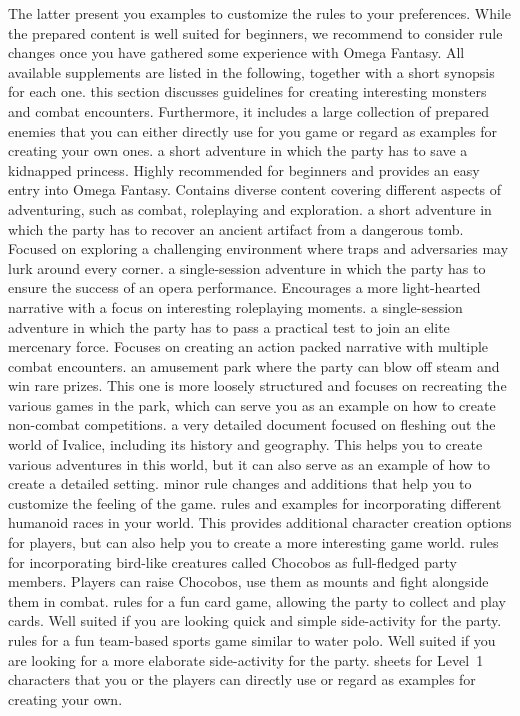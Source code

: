 The latter present you examples to customize the rules to your preferences.
While the prepared content is well suited for beginners, we recommend to consider rule changes once you have gathered some experience with Omega Fantasy.
All available supplements are listed in the following, together with a short synopsis for each one.
%
\newpage
%
 this section discusses guidelines for creating interesting monsters and combat encounters.
Furthermore, it includes a large collection of prepared enemies that you can either directly use for you game or regard as examples for creating your own ones.
%
\vfill
%
 a short adventure in which the party has to save a kidnapped princess. 
Highly recommended for beginners and provides an easy entry into Omega Fantasy.
Contains diverse content covering different aspects of adventuring, such as combat, roleplaying and exploration.
%
\vfill
%
 a short adventure in which the party has to recover an ancient artifact from a dangerous tomb.
Focused on exploring a challenging environment where traps and adversaries may lurk around every corner. 
%
\vfill
%
 a single-session adventure in which the party has to ensure the success of an opera performance.
Encourages a more light-hearted narrative with a focus on interesting roleplaying moments.
%
\vfill
%
 a single-session adventure in which the party has to pass a practical test to join an elite mercenary force.
Focuses on creating an action packed narrative with multiple combat encounters.
%
\vfill
%
 an amusement park where the party can blow off steam and win rare prizes. 
This one is more loosely structured and focuses on recreating the various games in the park, which can serve you as an example on how to create non-combat competitions.  
%
\vfill
%
 a very detailed document focused on fleshing out the world of Ivalice, including its history and geography.
This helps you to create various adventures in this world, but it can also serve as an example of how to create a detailed setting.
%
\vfill
%
 minor rule changes and additions that help you to customize the feeling of the game.
%
\vfill
%
 rules and examples for incorporating different humanoid races in your world. 
This provides additional character creation options for players, but can also help you to create a more interesting game world.
%
\vfill
%
 rules for incorporating bird-like creatures called Chocobos as full-fledged party members.
Players can raise Chocobos, use them as mounts and fight alongside them in combat.
%
\vfill
%
 rules for a fun card game, allowing the party to collect and play cards.
Well suited if you are looking quick and simple side-activity for the party.
%
\vfill
%
 rules for a fun team-based sports game similar to water polo.
Well suited if you are looking for a more elaborate side-activity for the party.
%
\vfill
%
 sheets for Level~1 characters that you or the players can directly use or regard as examples for creating your own.
%
\clearpage




